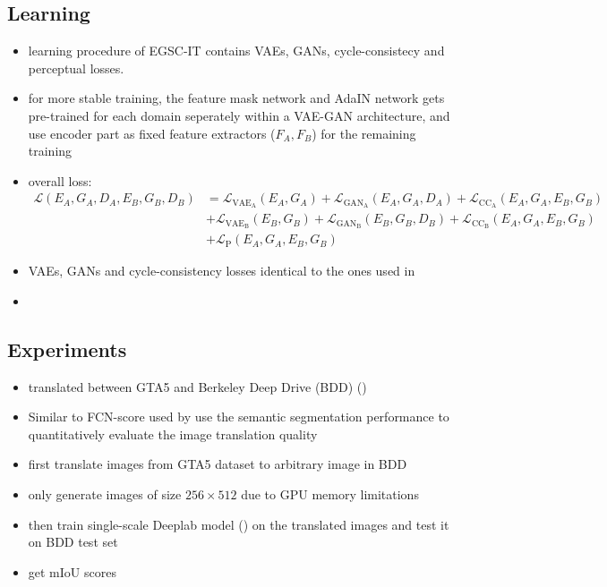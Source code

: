 \subsection{Learning}
\begin{itemize}
	\item learning procedure of EGSC-IT contains VAEs, GANs, cycle-consistecy and perceptual losses.
	\item for more stable training, the feature mask network and AdaIN network gets pre-trained for each domain seperately within a VAE-GAN architecture, and use encoder part as fixed feature extractors ($F_A, F_B$) for the remaining training
	\item overall loss: 
	\begin{align}
		\mathcal{L}(E_A, G_A, D_A, E_B, G_B, D_B) &= \mathcal{L}_{\text{VAE}_\text{A}}(E_A, G_A) + \mathcal{L}_{\text{GAN}_{\text{A}}}(E_A,G_A,D_A) + \mathcal{L}_{\text{CC}_{\text{A}}}(E_A, G_A, E_B, G_B)\\
		&+  \mathcal{L}_{\text{VAE}_\text{B}}(E_B, G_B) + \mathcal{L}_{\text{GAN}_{\text{B}}}(E_B,G_B,D_B) + \mathcal{L}_{\text{CC}_{\text{B}}}(E_A, G_A, E_B, G_B)\\
		&+ \mathcal{L}_{\text{P}}(E_A, G_A, E_B, G_B)
	\end{align}
	\item VAEs, GANs and cycle-consistency losses identical to the ones used in 
	\item {}
\end{itemize}

\subsection{Experiments}
\begin{itemize}
	\item translated between GTA5 and Berkeley Deep Drive (BDD) ()
	\item Similar to FCN-score used by  use the semantic segmentation performance to quantitatively evaluate the image translation quality
	\item first translate images from GTA5 dataset to arbitrary image in BDD
	\item only generate images of size $256 \times 512$ due to GPU memory limitations
	\item then train single-scale Deeplab model () on the translated images and test it on BDD test set
	\item get mIoU scores
\end{itemize}

